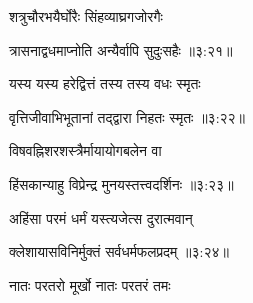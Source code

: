 {\devanagarifont शत्रुचौरभयैर्घोरैः सिंहव्याघ्रगजोरगैः \thinspace{\dandab} \dontdisplaylinenum }%


{\devanagarifont त्रासनाद्वधमाप्नोति अन्यैर्वापि सुदुःसहैः {॥३:२१॥} \veg\dontdisplaylinenum }%

{\devanagarifont यस्य यस्य हरेद्वित्तं तस्य तस्य वधः स्मृतः \thinspace{\dandab} \dontdisplaylinenum }%


{\devanagarifont वृत्तिजीवाभिभूतानां तद्द्वारा निहतः स्मृतः {॥३:२२॥} \veg\dontdisplaylinenum }%

{\devanagarifont विषवह्निशरशस्त्रैर्मायायोगबलेन वा \thinspace{\dandab} \dontdisplaylinenum }%


{\devanagarifont हिंसकान्याहु विप्रेन्द्र मुनयस्तत्त्वदर्शिनः {॥३:२३॥} \veg\dontdisplaylinenum }%


 

{\devanagarifont अहिंसा परमं धर्मं यस्त्यजेत्स दुरात्मवान् \thinspace{\dandab} \dontdisplaylinenum }%


{\devanagarifont क्लेशायासविनिर्मुक्तं सर्वधर्मफलप्रदम् {॥३:२४॥} \veg\dontdisplaylinenum }%
 
{\devanagarifont नातः परतरो मूर्खो नातः परतरं तमः \thinspace{\dandab} \dontdisplaylinenum }%

